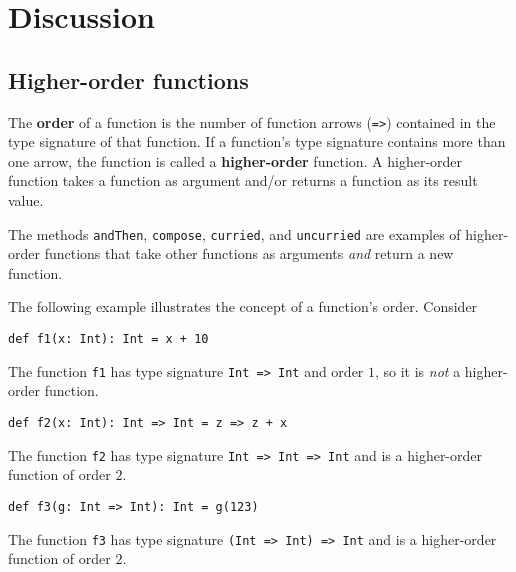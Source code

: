\section{Discussion}

\subsection{Higher-order functions}

The \textbf{order} of a function is the
number of function arrows (\lstinline!=>!)
contained in the type signature of that function. If a function's
type signature contains more than one arrow, the function is called
a \textbf{higher-order} function. A
higher-order function takes a function as argument and/or returns
a function as its result value.

The methods \lstinline!andThen!,
\lstinline!compose!, \lstinline!curried!,
and \lstinline!uncurried!
are examples of higher-order functions that take other functions as
arguments \emph{and} return a new function.

The following example illustrates the concept of a function's order.
Consider 
\begin{lstlisting}
def f1(x: Int): Int = x + 10
\end{lstlisting}
The function \texttt{}\lstinline!f1!
has type signature \texttt{}\lstinline!Int => Int!
and order $1$, so it is \emph{not} a higher-order function.
\begin{lstlisting}
def f2(x: Int): Int => Int = z => z + x
\end{lstlisting}
The function \texttt{}\lstinline!f2!
has type signature \texttt{}\lstinline!Int => Int => Int!
and is a higher-order function of order $2$. 
\begin{lstlisting}
def f3(g: Int => Int): Int = g(123)
\end{lstlisting}
The function \texttt{}\lstinline!f3!
has type signature \texttt{}\lstinline!(Int => Int) => Int!
and is a higher-order function of order $2$.

